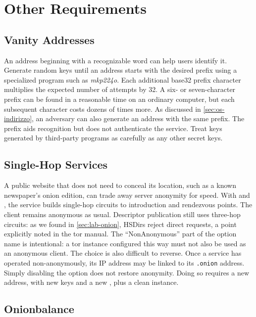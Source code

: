 \section{Other Requirements}\label{sec:onionp-altre}

\subsection{Vanity Addresses}

An address beginning with a recognizable word can help users identify it. Generate random keys until an address starts with the desired prefix using a specialized program such as \emph{mkp224o}. Each additional base32 prefix character multiplies the expected number of attempts by 32. A six- or seven-character prefix can be found in a reasonable time on an ordinary computer, but each subsequent character costs dozens of times more. As discussed in \cref{sec:os-indirizzo}, an adversary can also generate an address with the same prefix. The prefix aids recognition but does not authenticate the service. Treat keys generated by third-party programs as carefully as any other secret keys.

\subsection{Single-Hop Services}

A public website that does not need to conceal its location, such as a known newspaper's onion edition, can trade away server anonymity for speed. With  and , the service builds single-hop circuits to introduction and rendezvous points. The client remains anonymous as usual. Descriptor publication still uses three-hop circuits: as we found in \cref{sec:lab-onion}, HSDirs reject direct requests, a point explicitly noted in the tor manual. The \enquote{NonAnonymous} part of the option name is intentional: a tor instance configured this way must not also be used as an anonymous client. The choice is also difficult to reverse. Once a service has operated non-anonymously, its IP address may be linked to its \texttt{.onion} address. Simply disabling the option does not restore anonymity. Doing so requires a new address, with new keys and a new , plus a clean instance.

\subsection{Onionbalance}


